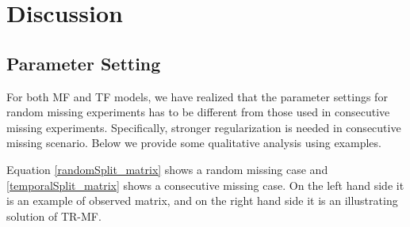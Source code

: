 \section{Discussion}  \label{sec:disc}



\subsection{Parameter Setting} \label{subsec:parameter}

For both MF and TF models, we have realized that the parameter settings for random missing experiments has to be different from those used in consecutive missing experiments. Specifically, stronger regularization is needed in consecutive missing scenario.
Below we provide some qualitative analysis using examples. 

Equation \ref{randomSplit_matrix} shows a random missing case and \ref{temporalSplit_matrix} shows a consecutive missing case. On the left hand side it is an example of observed matrix, and on the right hand side it is an illustrating solution of TR-MF.


